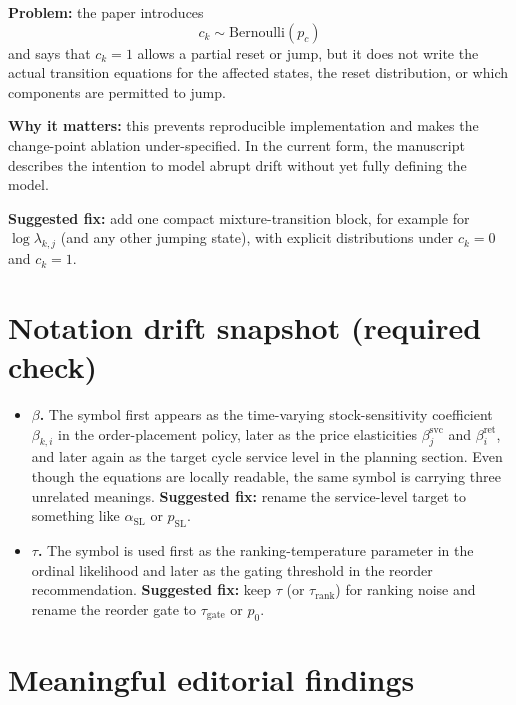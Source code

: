 \documentclass[11pt]{article}
\begin{document}
\begin{enumerate}
  \textbf{Problem:} the paper introduces
  \[
    c_k\sim\text{Bernoulli}(p_c)
  \]
  and says that $c_k=1$ allows a partial reset or jump, but it does not write the actual transition equations for the affected states, the reset distribution, or which components are permitted to jump.

  \textbf{Why it matters:} this prevents reproducible implementation and makes the change-point ablation under-specified.
  In the current form, the manuscript describes the intention to model abrupt drift without yet fully defining the model.

  \textbf{Suggested fix:} add one compact mixture-transition block, for example for $\log\lambda_{k,j}$ (and any other jumping state), with explicit distributions under $c_k=0$ and $c_k=1$.
\end{enumerate}

\section*{Notation drift snapshot (required check)}

\begin{itemize}
  \item \textbf{$\beta$.} The symbol first appears as the time-varying stock-sensitivity coefficient $\beta_{k,i}$ in the order-placement policy, later as the price elasticities $\beta^{\mathrm{svc}}_j$ and $\beta^{\mathrm{ret}}_i$, and later again as the target cycle service level in the planning section.
  Even though the equations are locally readable, the same symbol is carrying three unrelated meanings.
  \textbf{Suggested fix:} rename the service-level target to something like $\alpha_{\mathrm{SL}}$ or $p_{\mathrm{SL}}$.

  \item \textbf{$\tau$.} The symbol is used first as the ranking-temperature parameter in the ordinal likelihood and later as the gating threshold in the reorder recommendation.
  \textbf{Suggested fix:} keep $\tau$ (or $\tau_{\mathrm{rank}}$) for ranking noise and rename the reorder gate to $\tau_{\mathrm{gate}}$ or $p_0$.
\end{itemize}

\section*{Meaningful editorial findings}
\end{document}
